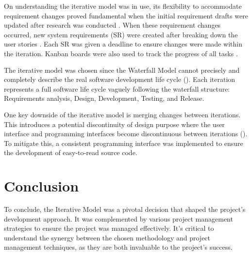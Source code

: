 On understanding the iterative model was in use, its flexibility to accommodate requirement changes proved fundamental when the initial requirement drafts were updated after research was conducted . When these requirement changes occurred, new system requirements (SR) were created after breaking down the user stories . Each SR was given a deadline to ensure changes were made within the iteration. Kanban boards were also used to track the progress of all tasks .

The iterative model was chosen since the Waterfall Model cannot precisely and completely describe the real software development life cycle (\cite{dapeng_liu_case_2011}). Each iteration represents a full software life cycle vaguely following the waterfall structure: Requirements analysis, Design, Development, Testing, and Release.

One key downside of the iterative model is merging changes between iterations. This introduces a potential discontinuity of design purpose where the user interface and programming interfaces become discontinuous between iterations (\cite{dapeng_liu_case_2011}). To mitigate this, a consistent programming interface was implemented to ensure the development of easy-to-read source code.

\section{Conclusion}

To conclude, the Iterative Model was a pivotal decision that shaped the project's development approach. It was complemented by various project management strategies  to ensure the project was managed effectively. It's critical to understand the synergy between the chosen methodology and project management techniques, as they are both invaluable to the project's success.
